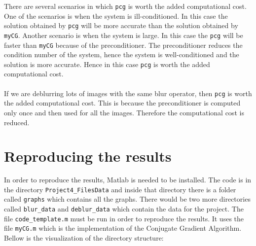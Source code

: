 \documentclass[unicode,11pt,a4paper,oneside,numbers=endperiod,openany]{scrartcl}
\begin{document}
There are several scenarios in which \texttt{pcg} is worth the added computational cost. One of the scenarios is when the system is ill-conditioned. In this case the solution obtained by \texttt{pcg} will be more accurate than the solution obtained by \texttt{myCG}. Another scenario is when the system is large. In this case the \texttt{pcg} will be faster than \texttt{myCG} because of the preconditioner. The preconditioner reduces the condition number of the system, hence the system is well-conditioned and the solution is more accurate. Hence in this case \texttt{pcg} is worth the added computational cost.
\\
\\
If we are deblurring lots of images with the same blur operator, then \texttt{pcg} is worth the added computational cost. This is because the preconditioner is computed only once and then used for all the images. Therefore the computational cost is reduced.


\section{Reproducing the results}
In order to reproduce the results, Matlab is needed to be installed. The code is in the directory \texttt\texttt{Project4\_FilesData} and inside that directory there is a folder called \texttt{graphs}  which contains all the graphs. There would be two more directories called \texttt{blur\_data} and \texttt{deblur\_data} which contain the data for the project. The file \texttt{code\_template.m} must be run in order to reproduce the results. It uses the file \texttt{myCG.m} which is the implementation of the Conjugate Gradient Algorithm.
\\

Bellow is the visualization of the directory structure:

\end{document}
